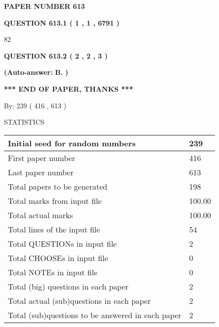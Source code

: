 \documentclass[12pt]{article}
\begin{document}
   
\newpage 
\setcounter{page}{ 
   613001 } 
   
   
 {\textbf{ \Large{ PAPER NUMBER  613  }}}
   
   
   
   
  
  
{\textbf{\large{QUESTION
613.1 
 ( 1 , 1 , 6791 )
}}}

82
  
  
{\textbf{\large{QUESTION
613.2 
 ( 2 , 2 , 3 )
}}}
 
 
{\textbf{(Auto-answer:}}
{\textbf{\large{
B.}}}
{\textbf{)}}
 
 
   
   
   
   
\vspace{1.0in} 
{\textbf{\large{ *** END OF PAPER, THANKS *** }}} 
   
   
\hspace{1.0in} By: 
 239 ( 416 ,  613 )
   
   
   
\vspace{0.2in}
\vspace{0.2in}
   
   
 \newpage
\setcounter{page}{1} 
   
   
 {\LARGE{STATISTICS}}
   
\vspace{0.2in}
   
 \begin{tabular}{|l|l|}
 \hline
 Initial seed for random numbers & 239  \\
\hline
 First paper number & 416  \\
\hline
 Last  paper number & 613  \\
\hline
 Total papers to be generated & 198  \\
\hline
Total marks from input file & 100.00 \\
\hline
Total actual marks & 100.00 \\
\hline
 Total lines of the input file & 54  \\
 \hline
 Total QUESTIONs in input file & 2  \\
\hline
 Total CHOOSEs in input file & 0  \\
\hline
 Total NOTEs in input file & 0  \\
\hline
 Total (big) questions in each paper & 2  \\
\hline
 Total actual (sub)questions in each paper & 2  \\
\hline
 Total (sub)questions to be answered in each paper & 2  \\
\hline
 \end{tabular}
   
\end{document}
